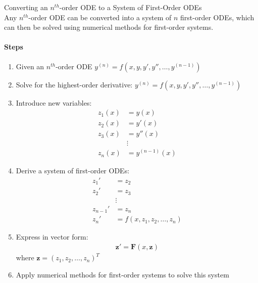 \begin{KR}{Converting an $n^{th}$-order ODE to a System of First-Order ODEs}\\
Any $n^{th}$-order ODE can be converted into a system of $n$ first-order ODEs, which can then be solved using numerical methods for first-order systems.

\paragraph{Steps}
\begin{enumerate}
    \item Given an $n^{th}$-order ODE $y^{(n)} = f(x, y, y', y'', \ldots, y^{(n-1)})$
    \item Solve for the highest-order derivative: $y^{(n)} = f(x, y, y', y'', \ldots, y^{(n-1)})$
    \item Introduce new variables: 
    \begin{align*}
    z_1(x) &= y(x)\\
    z_2(x) &= y'(x)\\
    z_3(x) &= y''(x)\\
    &\vdots\\
    z_n(x) &= y^{(n-1)}(x)
    \end{align*}
    \item Derive a system of first-order ODEs:
    \begin{align*}
    z_1' &= z_2\\
    z_2' &= z_3\\
    &\vdots\\
    z_{n-1}' &= z_n\\
    z_n' &= f(x, z_1, z_2, \ldots, z_n)
    \end{align*}
    \item Express in vector form:
    \begin{align*}
    \mathbf{z}' = \mathbf{F}(x, \mathbf{z})
    \end{align*}
    where $\mathbf{z} = (z_1, z_2, \ldots, z_n)^T$
    \item Apply numerical methods for first-order systems to solve this system
\end{enumerate}
\end{KR}

